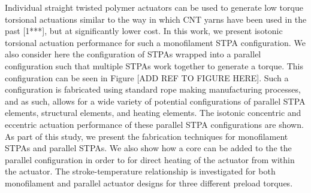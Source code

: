 \documentclass[twocolumn,10pt]{asme2e}
\begin{document}
Individual straight twisted polymer actuators can be used to generate low torque torsional actuations similar to the way in which CNT yarns have been used in the past [1***], but at significantly lower cost. In this work, we present isotonic torsional actuation performance for such a monofilament STPA configuration. We also consider here the configuration of STPAs wrapped into a parallel configuration such that multiple STPAs work together to generate a torque. This configuration can be seen in Figure [ADD REF TO FIGURE HERE]. Such a configuration is fabricated using standard rope making manufacturing processes, and as such, allows for a wide variety of potential configurations of parallel STPA elements, structural elements, and heating elements. The isotonic concentric and eccentric actuation performance of these parallel STPA configurations are shown. As part of this study, we present the fabrication techniques for monofilament STPAs and parallel STPAs. We also show how a core can be added to the the parallel configuration in order to for direct heating of the actuator from within the actuator. The stroke-temperature relationship is investigated for both monofilament and parallel actuator designs for three different preload torques. 

%
%
%
%
%
% 
 
\end{document}
